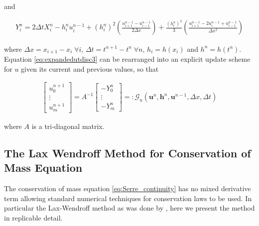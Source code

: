 \documentclass[SingleSpace,12pt,Proceedings]{Serre_ASCE}
\begin{document}
and
\begin{linenomath*}
\begin{gather*}
Y_i^n = 2\Delta tX_i^{n} - h_i^{n}u_i^{n-1} + \left(h_i^{n}\right)^2\left(\frac{u^{n-1}_{i+1} -u^{n-1}_{i-1} }{2 \Delta x}\right) + \frac{\left(h_i^{n}\right)^3}{3}\left(\frac{u^{n-1}_{i+1} - 2u^{n-1}_{i} + u^{n-1}_{i-1} }{\Delta x^2}\right)
\label{eq:expandfactor Xp}
\end{gather*}
\end{linenomath*}
where $\Delta x = x_{i+1} - x_i \; \forall i$, $\Delta t = t^{n+1} - t^{n} \; \forall n$,  $h_i = h(x_i)$ and $h^n = h(t^n)$. Equation \eqref{eq:expandedutdisc3} can be rearranged into an explicit update scheme for $u$ given its current and previous values, so that
\begin{linenomath*}
\begin{gather}
\left[\begin{array}{c}
 u^{n+1}_0 \\
 \vdots \\
 u^{n+1}_m \end{array}\right]
 = A^{-1} \left[\begin{array}{c}
  -Y^n_0 \\
  \vdots \\
  -Y^n_m \end{array}\right] =: \mathcal{G}_u\left(\boldsymbol{u}^n,\boldsymbol{h}^n, \boldsymbol{u}^{n-1}, \Delta x, \Delta t \right)
\label{eq:FDcentforu}
\end{gather}
\end{linenomath*}
where $A$ is a tri-diagonal matrix.

\subsection{The Lax Wendroff Method for Conservation of Mass Equation}
\label{section:}
The conservation of mass equation \eqref{eq:Serre_continuity} has no mixed derivative term allowing standard numerical techniques for conservation laws to be used. In particular the Lax-Wendroff method as was done by , here we present the method in replicable detail.
\end{document}

